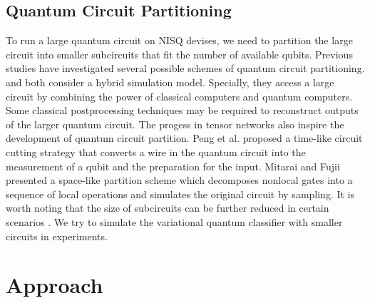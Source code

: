 \documentclass[sigconf]{acmart}
\begin{document}
\subsection{Quantum Circuit Partitioning}
To run a large quantum circuit on NISQ devises, we need to partition the large circuit into smaller subcircuits that fit the number of available qubits. Previous studies have investigated several possible schemes of quantum circuit partitioning. \cite{bravyi2016} and \cite{tang2021} both consider a hybrid simulation model. Specially, they access a large circuit by combining the power of classical computers and quantum computers. Some classical postprocessing techniques may be required to reconstruct outputs of the larger quantum circuit. The progess in tensor networks also inspire the development of quantum circuit partition. Peng et al. \cite{peng2020} proposed a time-like circuit cutting strategy that converts a wire in the quantum circuit into the measurement of a qubit and the preparation for the input. Mitarai and Fujii \cite{mitarai2021} presented a space-like partition scheme which decomposes nonlocal gates into a sequence of local operations and simulates the original circuit by sampling. It is worth noting that the size of subcircuits can be further reduced in certain scenarios \cite{marshall2022high}. We try to simulate the variational quantum classifier with smaller circuits in experiments.

\section{Approach}
\end{document}
